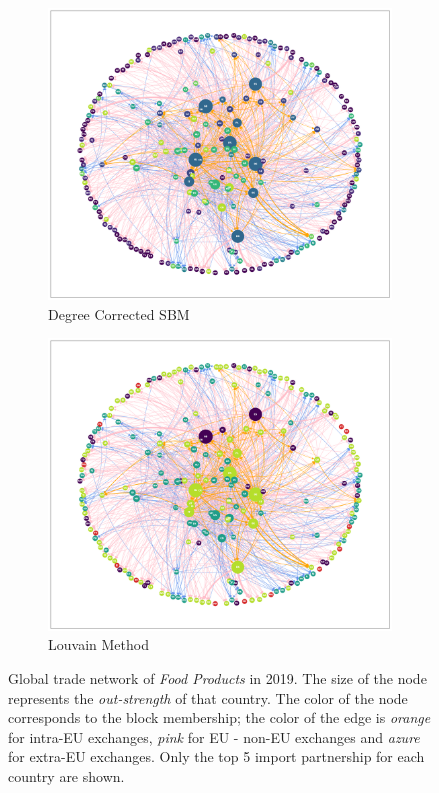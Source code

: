 \begin{figure}[H]
    \centering
    \begin{subfigure}{0.8\textwidth}
        \centering
        \includegraphics[width=\textwidth]{pics/full_y19_p10_force_143_dc.png}
        \caption{Degree Corrected SBM}
        \label{fig:foodnetworkdc}
    \end{subfigure}

    \begin{subfigure}{0.8\textwidth}
        \centering
        \includegraphics[width=\textwidth]{pics/full_y19_p10_force_144_lou.png}
        \caption{Louvain Method}
        \label{fig:foodnetworklou}
    \end{subfigure}
    \caption[Global trade network of \textit{Food Products} in 2019, with communities.]{Global trade network of \textit{Food Products} in 2019. The size of the node represents the \textit{out-strength} of that country. The color of the node corresponds to the block membership; the color of the edge is \textit{orange} for intra-EU exchanges, \textit{pink} for EU - non-EU exchanges and \textit{azure} for extra-EU exchanges. Only the top 5 import partnership for each country are shown.}
    \label{fig:foodcommunities}
\end{figure}